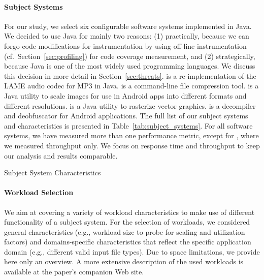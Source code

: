 \paragraph{Subject Systems}
For our study, we select six configurable software systems implemented in Java. We decided to use Java for mainly two reasons: (1) practically, because we can forgo code modifications for instrumentation by using off-line instrumentation (cf.~Section~\ref{sec:profiling}) for code coverage measurement, and (2) strategically, because Java is one of the most widely used programming languages. We discuss this decision in more detail in Section~\ref{sec:threats}. 
{\color{purple}\jumper is a re-implementation of the LAME audio codec for MP3 in Java. \kanzi is a command-line file compression tool. \dconvert is a Java utility to scale images for use in Android apps into different formats and different resolutions. \batik is a Java utility to rasterize vector graphics. \jadx is a decompiler and deobfuscator for Android applications.} The full list of our subject systems and characteristics is presented in Table~\ref{tab:subject_systems}. 
For all software systems, we have measured more than one performance metric, except for \htwo, where we measured throughput only. We focus on response time and throughput to keep our analysis and results comparable.

\begin{table}[h]
	\footnotesize
	\centering
	\caption{Subject System Characteristics}
	
	\label{tab:subject_systems}
\end{table}

\paragraph{Workload Selection}
We aim at covering a variety of workload characteristics to make use of different functionality of a subject system. 
For the selection of workloads, we considered general characteristics (e.g., workload size to probe for scaling and utilization factors) and domains-specific characteristics that reflect the specific application domain (e.g., different valid input file types).
Due to space limitations, we provide here only an overview. A more extensive description of the used workloads is available at the paper's companion Web site.

